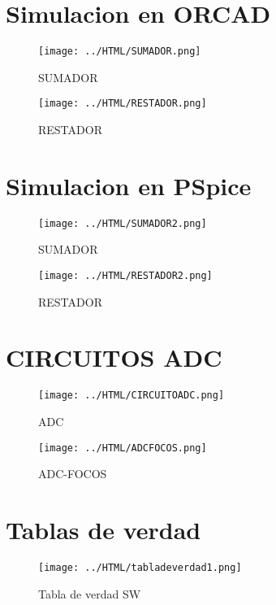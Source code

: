 \documentclass[11pt,a4paper]{article}
\begin{document}
\newpage 
\section{Simulacion en ORCAD}
\begin{figure}[h]
\centering
\texttt{[image: ../HTML/SUMADOR.png]} 
\caption{SUMADOR}
\end{figure}

\begin{figure}[h]
\centering
\texttt{[image: ../HTML/RESTADOR.png]} 
\caption{RESTADOR}
\end{figure}

\newpage 

\section{Simulacion en PSpice}

\begin{figure}[h]
\centering
\texttt{[image: ../HTML/SUMADOR2.png]} 
\caption{SUMADOR}
\end{figure}

\begin{figure}[h]
\centering
\texttt{[image: ../HTML/RESTADOR2.png]} 
\caption{RESTADOR}
\end{figure}

\newpage 

\section{CIRCUITOS ADC}

\begin{figure}[h]
\centering
\texttt{[image: ../HTML/CIRCUITOADC.png]} 
\caption{ADC}
\end{figure}

\begin{figure}[h]
\centering
\texttt{[image: ../HTML/ADCFOCOS.png]} 
\caption{ADC-FOCOS}
\end{figure}

\newpage 

\section{Tablas de verdad}

\begin{figure}[h]
\centering
\texttt{[image: ../HTML/tabladeverdad1.png]}  
\caption{Tabla de verdad SW}
\end{figure}
\end{document}
